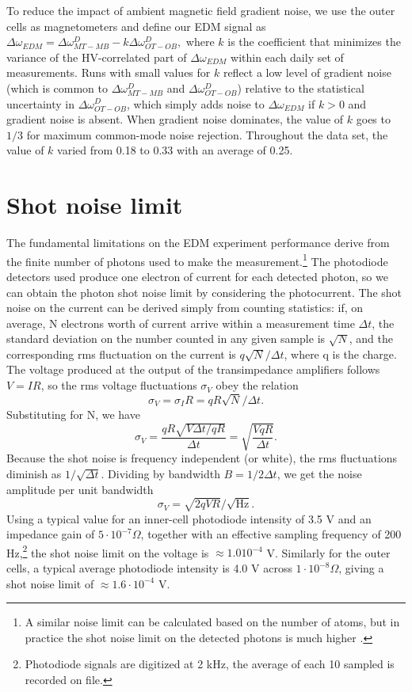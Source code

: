\documentclass [10pt, twoside] {uwthesis}[2012/04/02]
\begin{document}
To reduce the impact of ambient magnetic field gradient noise, we use the outer cells as magnetometers and define our EDM signal as $\Delta \omega_{EDM} = \Delta \omega^D_{MT-MB}- k\Delta \omega^D_{OT-OB},$ where $k$ is the coefficient that minimizes the variance of the HV-correlated part of $\Delta \omega_{EDM}$ within each daily set of measurements. Runs with small values for $k$ reflect a low level of gradient noise (which is common to $\Delta \omega^D_{MT-MB}$ and $\Delta \omega^D_{OT-OB}$) relative to the statistical uncertainty in $\Delta \omega^D_{OT-OB}$, which simply adds noise to $\Delta \omega_{EDM}$ if $k > 0$ and gradient noise is absent. When gradient noise dominates, the value of $k$ goes to $1/3$ for maximum common-mode noise rejection. Throughout the data set, the value of $k$ varied from 0.18 to 0.33 with an average of 0.25.

\section{Shot noise limit}
The fundamental limitations on the EDM experiment performance derive from the finite number of photons used to make the measurement.\footnote{A similar noise limit can be calculated based on the number of atoms, but in practice the shot noise limit on the detected photons is much higher \cite{Swallows}.} The photodiode detectors used produce one electron of current for each detected photon, so we can obtain the photon shot noise limit by considering the photocurrent. The shot noise on the current can be derived simply from counting statistics: if, on average, N electrons worth of current arrive within a measurement time $\Delta t$, the standard deviation on the number counted in any given sample is $\sqrt{N}$, and the corresponding rms fluctuation on the current is $q\sqrt{N}/\Delta t$, where q is the charge. The voltage produced at the output of the transimpedance amplifiers follows $V=IR$, so the rms voltage fluctuations $\sigma_V$ obey the relation
\begin{equation}
\sigma_V = \sigma_I R = q R \sqrt{N}/\Delta t.
\end{equation}
Substituting for N, we have
\begin{equation}
\sigma_V = \dfrac{q R \sqrt{V\Delta t/qR}}{\Delta t} = \sqrt{\dfrac{VqR}{\Delta t}}.
\end{equation}
Because the shot noise is frequency independent (or white), the rms fluctuations diminish as $1/\sqrt{\Delta t}$. Dividing by bandwidth $B = 1/2\Delta t$, we get the noise amplitude per unit bandwidth
\begin{equation}
\sigma_V = \sqrt{2qVR}/\sqrt{\text{Hz}}.
\end{equation}
Using a typical value for an inner-cell photodiode intensity of 3.5 V and an impedance gain of $5 \cdot 10^{-7} \Omega$, together with an effective sampling frequency of 200 Hz,\footnote{Photodiode signals are digitized at 2 kHz, the average of each 10 sampled is recorded on file.} the shot noise limit on the voltage is $\approx 1.0 10^{-4}$ V. Similarly for the outer cells, a typical average photodiode intensity is 4.0 V across $1 \cdot 10^{-8} \Omega$, giving a shot noise limit of $\approx 1.6 \cdot 10^{-4}$ V. 
\end{document}
